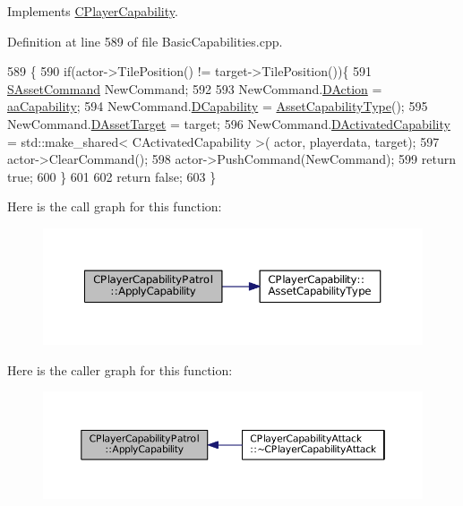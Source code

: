 Implements \hyperlink{classCPlayerCapability_a2ca6fd7fbd9c0178f1cf1d049c63825f}{C\+Player\+Capability}.



Definition at line 589 of file Basic\+Capabilities.\+cpp.


\begin{DoxyCode}
589                                                                                                            
                                                          \{
590     \textcolor{keywordflow}{if}(actor->TilePosition() != target->TilePosition())\{
591         \hyperlink{structSAssetCommand}{SAssetCommand} NewCommand;
592         
593         NewCommand.\hyperlink{structSAssetCommand_a8edd3b3d59a76d5514ba403bc8076a75}{DAction} = \hyperlink{GameDataTypes_8h_ab47668e651a3032cfb9c40ea2d60d670acf9fb164e8abd71c71f4a8c7fda360d4}{aaCapability};
594         NewCommand.\hyperlink{structSAssetCommand_a734ea7c6847457b437360f333f570ff9}{DCapability} = \hyperlink{classCPlayerCapability_a433bb196cd6ab6a932f1cac102b3aa98}{AssetCapabilityType}();
595         NewCommand.\hyperlink{structSAssetCommand_a3d9b43f6e59c386c48c41a65448a0c39}{DAssetTarget} = target;
596         NewCommand.\hyperlink{structSAssetCommand_ad8beda19520811cc70fe1eab16c774dd}{DActivatedCapability} = std::make\_shared< CActivatedCapability >(
      actor, playerdata, target);
597         actor->ClearCommand();
598         actor->PushCommand(NewCommand);
599         \textcolor{keywordflow}{return} \textcolor{keyword}{true};
600     \}
601 
602     \textcolor{keywordflow}{return} \textcolor{keyword}{false};
603 \}
\end{DoxyCode}
Here is the call graph for this function\+:\nopagebreak
\begin{figure}[H]
\begin{center}
\leavevmode
\includegraphics[width=350pt]{classCPlayerCapabilityPatrol_a6b9e361d99e256efadcd99a829f93f51_cgraph}
\end{center}
\end{figure}
Here is the caller graph for this function\+:\nopagebreak
\begin{figure}[H]
\begin{center}
\leavevmode
\includegraphics[width=350pt]{classCPlayerCapabilityPatrol_a6b9e361d99e256efadcd99a829f93f51_icgraph}
\end{center}
\end{figure}
